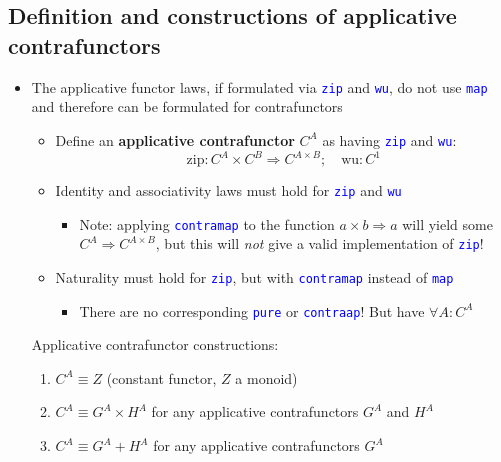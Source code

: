 \subsection{Definition and constructions of applicative contrafunctors}
\begin{itemize}
\item \vspace{-0.25cm}The applicative functor laws, if formulated via \texttt{\textcolor{blue}{\footnotesize{}zip}}
and \texttt{\textcolor{blue}{\footnotesize{}wu}}, do not use \texttt{\textcolor{blue}{\footnotesize{}map}}
and therefore can be formulated for contrafunctors
\begin{itemize}
\item Define an \textbf{applicative contrafunctor} $C^{A}$ as having \texttt{\textcolor{blue}{\footnotesize{}zip}}
and \texttt{\textcolor{blue}{\footnotesize{}wu}}:{\footnotesize{}
\[
\text{zip}:C^{A}\times C^{B}\Rightarrow C^{A\times B};\quad\text{wu}:C^{1}
\]
}{\footnotesize\par}
\item Identity and associativity laws must hold for \texttt{\textcolor{blue}{\footnotesize{}zip}}
and \texttt{\textcolor{blue}{\footnotesize{}wu}} 
\begin{itemize}
\item Note: applying \texttt{\textcolor{blue}{\footnotesize{}contramap}}
to the function $a\times b\Rightarrow a$ will yield some $C^{A}\Rightarrow C^{A\times B}$,
but this will \emph{not} give a valid implementation of \texttt{\textcolor{blue}{\footnotesize{}zip}}!
\end{itemize}
\item Naturality must hold for \texttt{\textcolor{blue}{\footnotesize{}zip}},
but with \texttt{\textcolor{blue}{\footnotesize{}contramap}} instead
of \texttt{\textcolor{blue}{\footnotesize{}map}} 
\begin{itemize}
\item There are no corresponding \texttt{\textcolor{blue}{\footnotesize{}pure}}
or \texttt{\textcolor{blue}{\footnotesize{}contraap}}! But have $\forall A:C^{A}$
\end{itemize}
\end{itemize}
Applicative contrafunctor constructions:
\begin{enumerate}
\item $C^{A}\equiv Z$ (constant functor, $Z$ a monoid)
\item $C^{A}\equiv G^{A}\times H^{A}$ for any applicative contrafunctors
$G^{A}$ and $H^{A}$
\item $C^{A}\equiv G^{A}+H^{A}$ for any applicative contrafunctors $G^{A}$

\end{enumerate}
\end{itemize}
